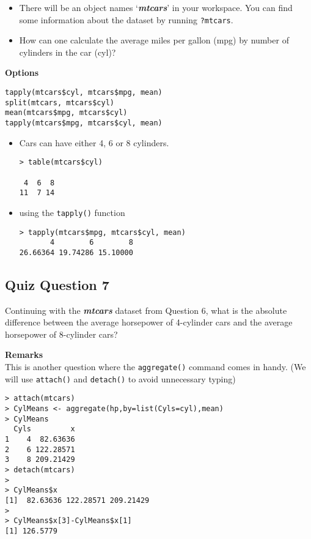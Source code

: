 \documentclass[12pt]{article}
\begin{document}
\begin{itemize}
\item There will be an object names `\textit{\textbf{mtcars}}' in your workspace. You can find some information about the dataset by running
\texttt{?mtcars}.

\item How can one calculate the average miles per gallon (mpg) by number of cylinders in the car (cyl)?
\end{itemize}
\textbf{Options}
\begin{verbatim}
tapply(mtcars$cyl, mtcars$mpg, mean)
split(mtcars, mtcars$cyl)
mean(mtcars$mpg, mtcars$cyl)
tapply(mtcars$mpg, mtcars$cyl, mean)
\end{verbatim}

\begin{itemize}
\item Cars can have either 4, 6 or 8 cylinders.
\begin{verbatim}
> table(mtcars$cyl)

 4  6  8 
11  7 14 
\end{verbatim}
\item using the \texttt{tapply()} function
\begin{verbatim}
> tapply(mtcars$mpg, mtcars$cyl, mean)
       4        6        8 
26.66364 19.74286 15.10000
\end{verbatim}
\end{itemize}
\newpage
\subsection*{Quiz Question 7}
Continuing with the \textit{\textbf{mtcars}} dataset from Question 6, what is the absolute difference between the average horsepower of 4-cylinder cars and the average horsepower of 8-cylinder cars?

\bigskip
\noindent \textbf{Remarks}\\
This is another question where the \texttt{aggregate()} command comes in handy. (We will use \texttt{attach()} and \texttt{detach()} to avoid unnecessary typing)
\begin{verbatim}
> attach(mtcars)
> CylMeans <- aggregate(hp,by=list(Cyls=cyl),mean)
> CylMeans 
  Cyls         x
1    4  82.63636
2    6 122.28571
3    8 209.21429
> detach(mtcars)
>
> CylMeans$x
[1]  82.63636 122.28571 209.21429
>
> CylMeans$x[3]-CylMeans$x[1]
[1] 126.5779
\end{verbatim}
\end{document}

